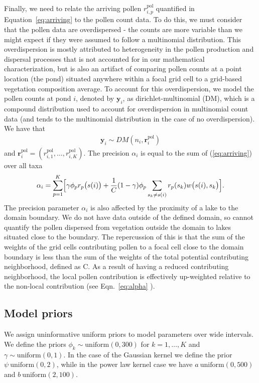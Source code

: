 \documentclass[12pt]{article}
\begin{document}
Finally, we need to relate the arriving pollen $r_{i,p}^{\text{pol}}$
quantified in Equation~\ref{eq:arriving} to the pollen count data. To
do this, we must consider that the pollen data are overdispersed - the
counts are more variable than we might expect if they were assumed to
follow a multinomial distribution. This overdispersion is mostly
attributed to heterogeneity in the pollen production and dispersal
processes that is not accounted for in our mathematical
characterization, but is also an artifact of comparing pollen counts
at a point location (the pond) situated anywhere within a focal grid
cell to a grid-based vegetation composition average. To account for
this overdispersion, we model the pollen counts at pond $i$, denoted
by $\bm{y}_i$, as dirichlet-multinomial (DM), which is a compound
distribution used to account for overdispersion in multinomial count
data (and tends to the multinomial distribution in the case of no
overdispersion). We have that
\begin{align}
\bm{y}_i \sim DM (n_i, \bm{r}_i^{\text{pol}})
\label{eq:DM}
\end{align}
and $\bm{r}_i^{\text{pol}} = (r_{i,1}^{\text{pol}}, \ldots,
r_{i,K}^{\text{pol}})$.  The precision $\alpha_i$ is equal to the sum
of (\ref{eq:arriving}) over all taxa
\begin{align}
\alpha_i = \sum_{p=1}^K \Bigl[\gamma \phi_p r_p\bigl(s(i)\bigr) + \frac{1}{C} (1-\gamma) \phi_p \sum_{s_k \neq s(i) } r_p(s_k) w\bigl(s(i), s_k\bigr)\Bigr].
\label{eq:alpha}
\end{align}
The precision parameter $\alpha_i$ is also affected by the proximity
of a lake to the domain boundary. We do not have data outside of the
defined domain, so cannot quantify the pollen dispersed from
vegetation outside the domain to lakes situated close to the
boundary. The repercussion of this is that the sum of the weights of
the grid cells contributing pollen to a focal cell close to the domain
boundary is less than the sum of the weights of the total potential
contributing neighborhood, defined as C. As a result of having a
reduced contributing neighborhood, the local pollen contribution is
effectively up-weighted relative to the non-local contribution (see
Eqn.~\ref{eq:alpha} ).

\subsection{Model priors}

We assign uninformative uniform priors to model parameters over wide
intervals. We define the priors $\phi_k \sim \text{uniform}(0, 300)$ for
$k=1, \ldots, K$ and $\gamma \sim \text{uniform}(0,1)$. In the case of the
Gaussian kernel we define the prior $\psi ~ \text{uniform}(0, 2)$, while in
the power law kernel case we have $a ~ \text{uniform}(0, 500)$ and
$b~\text{uniform}(2, 100)$.
\end{document}
